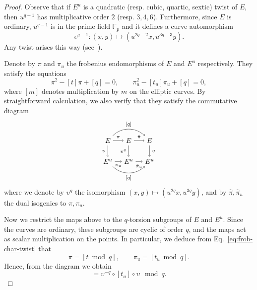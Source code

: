 \documentclass[12pt]{article}
\theoremstyle{plain}
\theoremstyle{definition}
\def\F{\ensuremath{\mathbb{F}}}
\begin{document}
\begin{proof}
  Observe that if $E^u$ is a quadratic (resp. cubic, quartic, sextic)
  twist of $E$, then $u^{q-1}$ has multiplicative order $2$
  (resp. $3,4,6$). Furthermore, since $E$ is ordinary, $u^{q-1}$ is in
  the prime field $\F_p$ and it defines a curve automorphism
  \begin{equation*}
    \upsilon^{q-1}:(x,y)\mapsto(u^{2q-2}x,u^{3q-3}y).
  \end{equation*}
  Any twist arises this way (see~\cite{Sil}).

  Denote by $\pi$ and $\pi_u$ the frobenius endomorphisms of $E$
  and $E^u$ respectively. They satisfy the equations
  \begin{equation}
    \label{eq:frob-char-twist}
    \pi^2 - [t]\pi + [q] = 0, \qquad \pi_u^2 - [t_u]\pi_u + [q] = 0,
  \end{equation}
  where $[m]$ denotes multiplication by $m$ on the elliptic curves. By
  straightforward calculation, we also verify that they satisfy the
  commutative diagram
  \begin{equation*}
    \begin{tikzpicture}[node distance=3em]
      \node(E){$E$};
      \node[right of=E](E2){$E$};
      \node[right of=E2](E3){$E$};
      \node[below of=E](Eu){$E^u$};
      \node[right of=Eu](Eu2){$E^u$};
      \node[right of=Eu2](Eu3){$E^u$};

      \draw[->,auto,font=\scriptsize]
      (E) edge node[swap]{$\upsilon$} (Eu)
          edge node{$\pi$} (E2)
          edge[bend left=45] node{$[q]$} (E3)
      (Eu) edge node[swap]{$\pi_u$} (Eu2)
           edge[bend right=45] node[swap]{$[q]$} (Eu3)
      (E2) edge node[swap]{$\upsilon^q$} (Eu2)
           edge node{$\hat\pi$} (E3)
      (Eu2) edge node[swap]{$\hat\pi_u$} (Eu3)
      (E3) edge node{$\upsilon$} (Eu3);
    \end{tikzpicture}
  \end{equation*}
  where we denote by $\upsilon^q$ the isomorphism
  $(x,y)\mapsto(u^{2q}x,u^{3q}y)$, and by $\hat\pi,\hat\pi_u$ the dual isogenies
  to $\pi,\pi_u$.

  Now we restrict the maps above to the $q$-torsion subgroups of $E$
  and $E^u$. Since the curves are ordinary, these subgroups are cyclic
  of order $q$, and the maps act as scalar multiplication on the
  points. In particular, we deduce from Eq.~\eqref{eq:frob-char-twist} that 
  \begin{equation*}
    \pi = [t \bmod q], \qquad \pi_u = [t_u \bmod q].
  \end{equation*}
  Hence, from the diagram we obtain
  \begin{equation*}
    [t] = \upsilon^{-q}\circ[t_u]\circ\upsilon \mod q.
  \end{equation*}


\end{proof}
\end{document}
